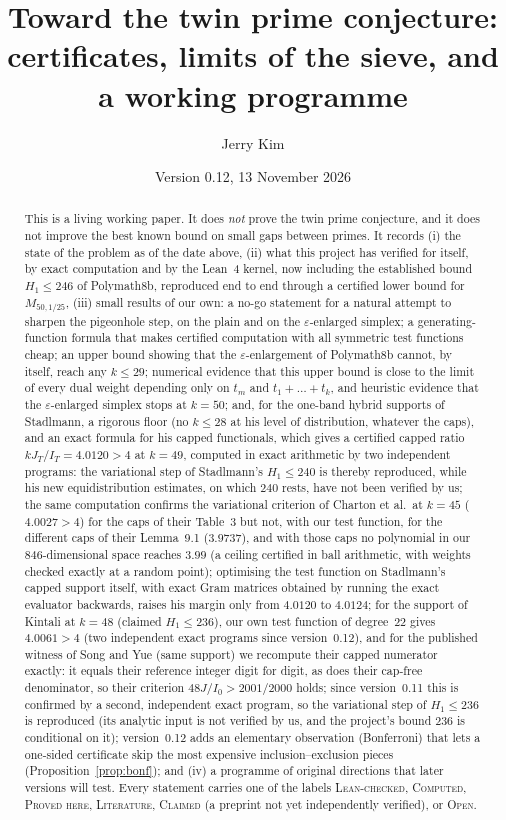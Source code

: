 \documentclass[11pt]{amsart}
\title[Toward the twin prime conjecture]{Toward the twin prime conjecture: certificates, limits of the sieve, and a working programme}
\author{Jerry Kim}
\date{Version 0.12, 13 November 2026}
\theoremstyle{definition}
\theoremstyle{remark}
\newcommand{\lbl}[1]{\textup{\textsc{#1}}}
\begin{document}
\begin{abstract}
This is a living working paper. It does \emph{not} prove the twin prime
conjecture, and it does not improve the best known bound on small gaps between
primes. It records (i) the state of the problem as of the date above, (ii) what
this project has verified for itself, by exact computation and by the Lean~4
kernel, now including the established bound $H_1\le246$ of Polymath8b,
reproduced end to end through a certified lower bound for $M_{50,1/25}$,
(iii) small results of our own: a no-go statement for a natural
attempt to sharpen the pigeonhole step, on the plain and on the
$\varepsilon$-enlarged simplex; a generating-function formula that makes
certified computation with all symmetric test functions cheap; an upper
bound showing that the $\varepsilon$-enlargement of Polymath8b cannot, by
itself, reach any $k\le29$; numerical evidence that this upper bound is close
to the limit of every dual weight depending only on $t_m$ and $t_1+\dots+t_k$,
and heuristic evidence that the $\varepsilon$-enlarged simplex stops at
$k=50$; and, for the one-band hybrid supports of Stadlmann, a rigorous
floor (no $k\le28$ at his level of distribution, whatever the caps), and an
exact formula for his capped functionals, which gives a certified capped
ratio $kJ_T/I_T=4.0120>4$ at $k=49$, computed in exact arithmetic by two
independent programs: the variational step of Stadlmann's $H_1\le240$ is
thereby reproduced, while his new equidistribution estimates, on which $240$
rests, have not been verified by us; the same computation confirms the
variational criterion of Charton et al.\ at $k=45$ ($4.0027>4$) for the caps
of their Table~3 but not, with our test function, for the different caps of
their Lemma~9.1 ($3.9737$), and with those caps no polynomial in our
$846$-dimensional space reaches $3.99$ (a ceiling certified in ball
arithmetic, with weights checked exactly at a random point); optimising the test function on Stadlmann's
capped support itself, with exact Gram matrices obtained by running the exact
evaluator backwards, raises his margin only from $4.0120$ to $4.0124$;
for the support of Kintali at $k=48$ (claimed $H_1\le236$), our own test
function of degree~$22$ gives $4.0061>4$ (two independent exact programs since version~0.12), and
for the published witness of Song and Yue (same support) we recompute their
capped numerator exactly: it equals their reference integer digit for digit,
as does their cap-free denominator, so their criterion $48J/I_0>2001/2000$
holds; since version~0.11 this is confirmed by a second, independent exact
program, so the variational step of $H_1\le236$ is reproduced (its analytic
input is not verified by us, and the project's bound $236$ is conditional on
it); version~0.12 adds an elementary observation (Bonferroni) that lets a
one-sided certificate skip the most expensive inclusion--exclusion pieces
(Proposition~\ref{prop:bonf}); and
(iv) a programme of original
directions that later versions will test. Every statement carries one of the
labels \lbl{Lean-checked}, \lbl{Computed}, \lbl{Proved here},
\lbl{Literature}, \lbl{Claimed} (a preprint not yet independently
verified), or \lbl{Open}.
\end{abstract}
\end{document}
